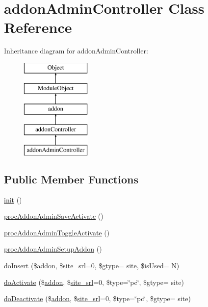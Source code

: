 \hypertarget{classaddonAdminController}{}\section{addon\+Admin\+Controller Class Reference}
\label{classaddonAdminController}
Inheritance diagram for addon\+Admin\+Controller\+:\begin{figure}[H]
\begin{center}
\leavevmode
\includegraphics[height=5.000000cm]{classaddonAdminController}
\end{center}
\end{figure}
\subsection*{Public Member Functions}
\begin{DoxyCompactItemize}
\item 
\hyperlink{classaddonAdminController_a429384cd42bbb45d8a9f6be4073cc7b6}{init} ()
\item 
\hyperlink{classaddonAdminController_a59081b3459b0704e973fdbe2fc5d14d1}{proc\+Addon\+Admin\+Save\+Activate} ()
\item 
\hyperlink{classaddonAdminController_a97250cb7cb4dc0b78789b8a9186d94d4}{proc\+Addon\+Admin\+Toggle\+Activate} ()
\item 
\hyperlink{classaddonAdminController_a43db10c21a41c0ebbeb13257d9bf86ea}{proc\+Addon\+Admin\+Setup\+Addon} ()
\item 
\hyperlink{classaddonAdminController_a26ac8a98f91ad7a48d9307b7a87932c7}{do\+Insert} (\$\hyperlink{classaddon}{addon}, \$\hyperlink{ko_8install_8php_a8b1406b4ad1048041558dce6bfe89004}{site\+\_\+srl}=0, \$gtype= \textquotesingle{}site\textquotesingle{}, \$is\+Used= \textquotesingle{}\hyperlink{jquery-1_8x_8min_8js_ab8a5cba0bbaa18ec7f830663874cb9d0}{N}\textquotesingle{})
\item 
\hyperlink{classaddonAdminController_a226fc2d221e8f5272dabeb1ef86cb9f3}{do\+Activate} (\$\hyperlink{classaddon}{addon}, \$\hyperlink{ko_8install_8php_a8b1406b4ad1048041558dce6bfe89004}{site\+\_\+srl}=0, \$type=\char`\"{}pc\char`\"{}, \$gtype= \textquotesingle{}site\textquotesingle{})
\item 
\hyperlink{classaddonAdminController_ae520cdfe4f5e3f2e7c24c34d5a8d316e}{do\+Deactivate} (\$\hyperlink{classaddon}{addon}, \$\hyperlink{ko_8install_8php_a8b1406b4ad1048041558dce6bfe89004}{site\+\_\+srl}=0, \$type=\char`\"{}pc\char`\"{}, \$gtype= \textquotesingle{}site\textquotesingle{})
\end{DoxyCompactItemize}
